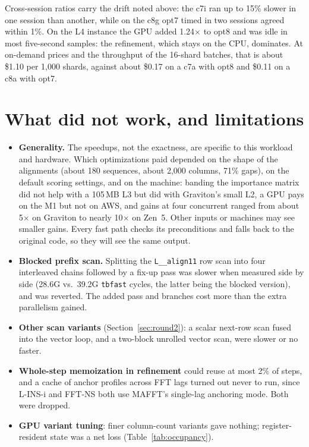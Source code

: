 \documentclass[11pt]{article}
\newcommand{\code}[1]{\texttt{#1}}
\begin{document}
Cross-session ratios carry the drift noted above: the c7i ran up to 15\% slower in one session
than another, while on the c8g opt7 timed in two sessions agreed within 1\%. On the L4 instance
the GPU added 1.24$\times$ to opt8 and was idle in most five-second samples: the refinement, which
stays on the CPU, dominates. At on-demand prices and the throughput of the 16-shard batches, that
is about \$1.10 per 1{,}000 shards, against
about \$0.17 on a c7a with opt8 and \$0.11 on a c8a with opt7.

\section{What did not work, and limitations}

\begin{itemize}
\item \textbf{Generality.} The speedups, not the exactness, are specific to this workload and
  hardware. Which optimizations paid depended on the shape of the alignments (about 180
  sequences, about 2{,}000 columns, 71\% gaps), on the default scoring settings, and on the
  machine: banding the importance matrix did not help with a 105\,MB L3 but did with Graviton's
  small L2, a GPU pays on the M1 but not on AWS, and gains at four concurrent ranged from
  about 5$\times$ on Graviton to nearly 10$\times$ on Zen~5. Other inputs or machines may see smaller gains. Every
  fast path checks its preconditions and falls back to the original code, so they will see
  the same output.
\item \textbf{Blocked prefix scan.} Splitting the \code{L\_\_align11} row scan into four
  interleaved chains followed by a fix-up pass was slower when measured side by side
  (28.6G vs.\ 39.2G \code{tbfast} cycles, the latter being the blocked version), and was
  reverted. The added pass and branches cost more than the extra parallelism gained.
\item \textbf{Other scan variants} (Section~\ref{sec:round2}): a scalar next-row scan fused into
  the vector loop, and a two-block unrolled vector scan, were slower or no faster.
\item \textbf{Whole-step memoization in refinement} could reuse at most 2\% of steps, and a
  cache of anchor profiles across FFT lags turned out never to run, since L-INS-i and
  FFT-NS both use MAFFT's single-lag anchoring mode. Both were dropped.
\item \textbf{GPU variant tuning}: finer column-count variants gave nothing; register-resident
  state was a net loss (Table~\ref{tab:occupancy}).

\end{itemize}
\end{document}
